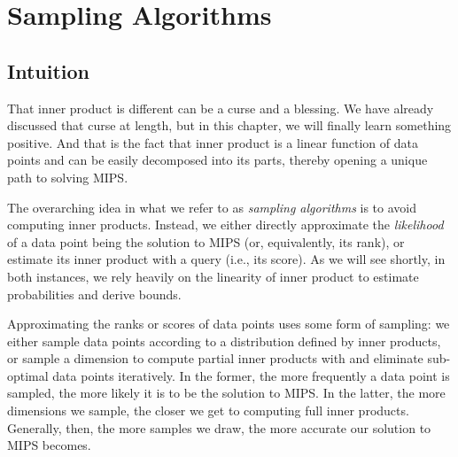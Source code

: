 \chapter{Sampling Algorithms}
\label{chapter:sampling}


\section{Intuition}
\label{section:sampling:intuition}

That inner product is different can be a curse and a blessing.
We have already discussed that curse at length, but in this chapter,
we will finally learn something positive. And that is the fact that inner product
is a linear function of data points and can be easily decomposed into its parts,
thereby opening a unique path to solving MIPS.

The overarching idea in what we refer to as \emph{sampling algorithms} is to avoid
computing inner products. Instead, we either directly approximate the \emph{likelihood}
of a data point being the solution to MIPS (or, equivalently, its rank),
or estimate its inner product with a query (i.e., its score).
As we will see shortly, in both instances, we rely heavily on the linearity of inner product
to estimate probabilities and derive bounds.

Approximating the ranks or scores of data points uses some form of sampling:
we either sample data points according to a distribution defined by inner products,
or sample a dimension to compute partial inner products with and eliminate sub-optimal
data points iteratively. In the former, the more frequently a data point is sampled,
the more likely it is to be the solution to MIPS. In the latter, the more dimensions
we sample, the closer we get to computing full inner products.
Generally, then, the more samples we draw, the more accurate our solution to MIPS becomes.

